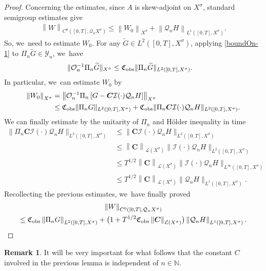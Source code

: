 \documentclass[JEP,XML,SOM,Unicode,published]{cedram}
\theoremstyle{definition}
\newtheorem{remark}[theorem]{Remark}
\let\mc\mathcal
\renewcommand{\O}{\mc{O}}
\newcommand{\Y}{\mc{Y}}
\newcommand{\N}{\mathbb{N}}
\newcommand{\Q}{\mathcal{Q}}
\newcommand{\bC}{\boldsymbol{C}}
\providecommand{\norm}[1]{\lVert#1\rVert}
\newcommand\nor[2]{\left\|#1\right\|_{#2}}
\begin{document}
\begin{proof}
Concerning the estimates, since $A$ is skew-adjoint on $X^{\sigma}$, standard semigroup estimates give\vspace*{-3pt}
\begin{align}
\nor{W}{C^{0}([0,T],\Q_{n}X^{\sigma})}\leq \nor{W_{0}}{X^{\sigma}}+\nor{\Q_{n} H}{L^{1}([0,T],X^{\sigma})}.
\end{align}
So, we~need to estimate $W_{0}$. For any $\widetilde{G}\in L^2([0, T], X^\sigma)$, applying \eqref{boundOn-1} to $\Pi_n \widetilde{G}\in \Y_n$, we~have\vspace*{-3pt}
\begin{align*}
\norm{\O_n^{-1}\Pi_n \widetilde{G}}_{X^\sigma}&\leq \mathfrak{C}_{\textup{obs}}\norm{\Pi_n\widetilde{G}}_{L^2([0, T], X^\sigma)}.
\end{align*}
In particular, we~can estimate $W_{0}$ by\vspace*{-3pt}
\begin{align*}
\nor{W_{0}}{X^{\sigma}}&= \nor{\O_n^{-1}\Pi_n\left[G-\bC\mc{I}(\cdot)\Q_n H\right]}{X^{\sigma}}\\ &\leq \mathfrak{C}_{\textup{obs}}\norm{\Pi_nG}_{L^2([0, T], X^\sigma)}+\mathfrak{C}_{\textup{obs}}\norm{\Pi_n\bC\mc{I}(\cdot)\Q_n H}_{L^2([0, T], X^\sigma)}.
\end{align*}
We can finally estimate by the unitarity of $\Pi_{n}$ and Hölder inequality in time\vspace*{-3pt}
\begin{align*}
\norm{\Pi_n\bC\mc{I}(\cdot)\Q_n H}_{L^2([0, T], X^\sigma)}&\leq \norm{\bC\mc{I}(\cdot)\Q_n H}_{L^2([0, T], X^\sigma)}\\ &\leq \nor{\bC}{\mc{L}(X^\sigma)}\norm{\mc{I}(\cdot)\Q_n H}_{L^2([0, T], X^\sigma)}\\
&\leq T^{1/2}\nor{\bC}{\mc{L}(X^\sigma)}\norm{\mc{I}(\cdot)\Q_n H}_{L^{\infty}([0, T], X^\sigma)}\\ &\leq T^{1/2}\nor{\bC}{\mc{L}(X^\sigma)}\norm{\Q_n H}_{L^{1}([0, T], X^\sigma)}.
\end{align*}
Recollecting the previous estimates, we~have finally proved\vspace*{-8pt}
\begin{multline*}
\nor{W}{C^{0}([0,T],\Q_{n}X^{\sigma})}\\\leq \mathfrak{C}_{\textup{obs}} \nor{\Pi_{n}G}{L^{2}([0,T],X^{\sigma})}+\bigl(1+T^{1/2}\mathfrak{C}_{\textup{obs}}\nor{\bC}{\mc{L}(X^\sigma)}\bigr)\nor{\Q_{n} H}{L^{1}([0,T],X^{\sigma})}.\qedhere
\end{multline*}
\end{proof}
\begin{remark}
It will be very important for what follows that the constant $C$ involved in the previous lemma is independent of $n\in\N$.
\end{remark}
\end{document}
